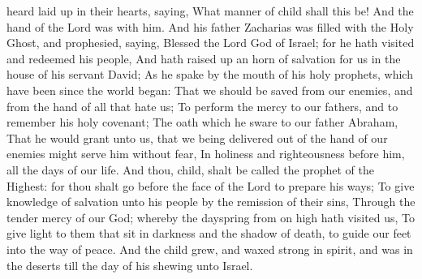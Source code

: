 {heard
{}
laid
{}
up
in
their
hearts,
saying,
What
manner of
child
shall
this
be!
And the
hand of the
Lord
was
with
him.
And
his
father
Zacharias was
filled with
the
Holy
Ghost,
and
prophesied,
saying,
Blessed
{} the
Lord
God of Israel;
for he hath
visited
and
redeemed
his
people,
And hath raised
up an
horn of
salvation for
us
in the
house
of
his
servant
David;
As he
spake
by the
mouth
of
his
holy
prophets,
which have been
since the world
began:
That we should be
saved
from
our
enemies,
and
from the
hand of
all that
hate
us;
To
perform the
mercy
{}
to
our
fathers,
and to
remember
his
holy
covenant;
The
oath
which he
sware
to
our
father
Abraham,
That he would
grant unto
us, that we being
delivered out
of the
hand
of
our enemies might
serve
him without
fear,
In
holiness
and
righteousness
before
him,
all the
days
of
our
life.
And
thou,
child, shalt be
called the
prophet of the
Highest:
for thou shalt
go
before the
face of the
Lord to
prepare
his
ways;
To
give
knowledge of
salvation
unto
his
people
by the
remission
of
their
sins,
Through
the
tender
mercy
of
our
God;
whereby the
dayspring
from on
high hath
visited
us,
To give
light to
them that
sit
in
darkness
and
{} the
shadow of
death, to
guide
our
feet
into the
way of
peace.
And the
child
grew,
and waxed
strong in
spirit,
and
was
in the
deserts
till the
day
of
his
shewing
unto
Israel.

}
